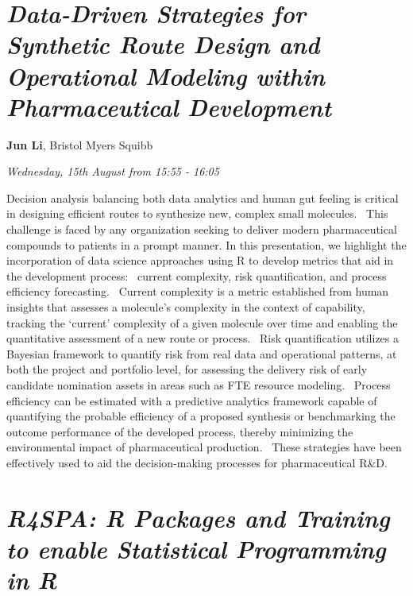 \documentclass[]{book}
\theoremstyle{definition}
\theoremstyle{definition}
\theoremstyle{definition}
\theoremstyle{remark}
\begin{document}
\hypertarget{data-driven-strategies-for-synthetic-route-design-and-operational-modeling-within-pharmaceutical-development}{%
\section{\texorpdfstring{\emph{Data-Driven Strategies for Synthetic
Route Design and Operational Modeling within Pharmaceutical
Development}}{Data-Driven Strategies for Synthetic Route Design and Operational Modeling within Pharmaceutical Development}}\label{data-driven-strategies-for-synthetic-route-design-and-operational-modeling-within-pharmaceutical-development}}

\textbf{Jun Li}, Bristol Myers Squibb

\emph{Wednesday, 15th August from 15:55 - 16:05}

Decision analysis balancing both data analytics and human gut feeling is
critical in designing efficient routes to synthesize new, complex small
molecules.~ This challenge is faced by any organization seeking to
deliver modern pharmaceutical compounds to patients in a prompt manner.
In this presentation, we highlight the incorporation of data science
approaches using R to develop metrics that aid in the development
process:~ current complexity, risk quantification, and process
efficiency forecasting.~ Current complexity is a metric established from
human insights that assesses a molecule's complexity in the context of
capability, tracking the `current' complexity of a given molecule over
time and enabling the quantitative assessment of a new route or
process.~ Risk quantification utilizes a Bayesian framework to quantify
risk from real data and operational patterns, at both the project and
portfolio level, for assessing the delivery risk of early candidate
nomination assets in areas such as FTE resource modeling.~ Process
efficiency can be estimated with a predictive analytics framework
capable of quantifying the probable efficiency of a proposed synthesis
or benchmarking the outcome performance of the developed process,
thereby minimizing the environmental impact of pharmaceutical
production.~ These strategies have been effectively used to aid the
decision-making processes for pharmaceutical R\&D.

\hypertarget{r4spa-r-packages-and-training-to-enable-statistical-programming-in-r}{%
\section{\texorpdfstring{\emph{R4SPA: R Packages and Training to enable
Statistical Programming in
R}}{R4SPA: R Packages and Training to enable Statistical Programming in R}}\label{r4spa-r-packages-and-training-to-enable-statistical-programming-in-r}}
\end{document}
